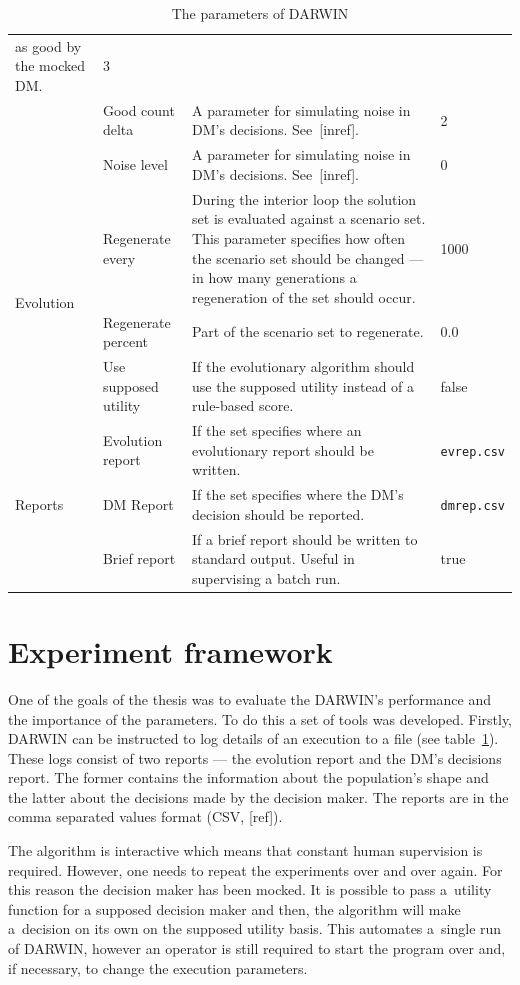 \begin{table}
\begin{tabular}{l l p{7cm} l}
    as good by the mocked DM. & 3 \\
    & Good count delta & A parameter for simulating noise in DM's decisions. See~[inref]. & 2 \\
    & Noise level & A parameter for simulating noise in DM's decisions. See~[inref]. & 0 \\
    \hline
    \multirow{3}{*}{Evolution} & Regenerate every & During the interior loop
    the solution set is evaluated against a scenario set. This parameter
    specifies how often the scenario set should be changed --- in how many
    generations a regeneration of the set should occur. & 1000 \\
    & Regenerate percent & Part of the scenario set to regenerate. & 0.0 \\
    & Use supposed utility & If the evolutionary algorithm should use the
    supposed utility instead of a rule-based score. & false \\
  \hline
  \multirow{3}{*}{Reports} & Evolution report & If the set specifies where an
  evolutionary report should be written.  & \texttt{evrep.csv} \\
  & DM Report & If the set specifies where the DM's decision should be reported. & \texttt{dmrep.csv} \\
  &  Brief report & If a brief report should be written to standard
  output. Useful in supervising a batch run. & true \\
  \hline
  \end{tabular}
  \caption{The parameters of DARWIN}
  \label{t:params}
\end{table}


\section{Experiment framework}
One of the goals of the thesis was to evaluate the DARWIN's performance and
the importance of the parameters. To do this a set of tools was
developed. Firstly, DARWIN can be instructed to log details of an execution to
a file (see table~\ref{t:params}). These logs consist of two reports --- the
evolution report and the DM's decisions report. The former contains the
information about the population's shape and the latter about the decisions
made by the decision maker. The reports are in the comma separated values
format (CSV, [ref]).

The algorithm is interactive which means that constant human supervision is
required. However, one needs to repeat the experiments over and over
again. For this reason the decision maker has been mocked. It is possible to
pass a~utility function for a supposed decision maker and then, the algorithm
will make a~decision on its own on the supposed utility basis. This automates
a~single run of DARWIN, however an operator is still required to start the
program over and, if necessary, to change the execution parameters.

